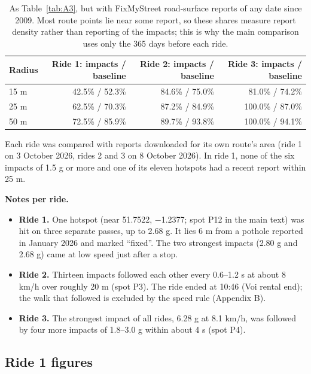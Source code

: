 \begin{table}[htbp]
\centering\small
\caption{As Table~\ref{tab:A3}, but with FixMyStreet road-surface reports of any date since 2009. Most route points lie near some report, so these shares measure report density rather than reporting of the impacts; this is why the main comparison uses only the 365 days before each ride.}\label{tab:A3any}
\begin{tabular}{@{}lrrr@{}}
\toprule
Radius & Ride 1: impacts / baseline & Ride 2: impacts / baseline & Ride 3: impacts / baseline \\
\midrule
15 m & 42.5\% / 52.3\% & 84.6\% / 75.0\% & 81.0\% / 74.2\% \\
25 m & 62.5\% / 70.3\% & 87.2\% / 84.9\% & 100.0\% / 87.0\% \\
50 m & 72.5\% / 85.9\% & 89.7\% / 93.8\% & 100.0\% / 94.1\% \\
\bottomrule
\end{tabular}
\end{table}

Each ride was compared with reports downloaded for its own route's area (ride 1 on
3 October 2026, rides 2 and 3 on 8 October 2026). In ride 1, none of the six impacts of
1.5 g or more and one of its eleven hotspots had a recent report within 25 m.

\textbf{Notes per ride.}

\begin{itemize}
\tightlist
\item
  \textbf{Ride 1.} One hotspot (near 51.7522, −1.2377; spot P12 in the main text) was hit on
  three separate passes, up to 2.68 g. It lies 6 m from a pothole reported in January
  2026 and marked ``fixed''. The two strongest impacts (2.80 g and 2.68 g) came at low
  speed just after a stop.
\item
  \textbf{Ride 2.} Thirteen impacts followed each other every 0.6--1.2 s at about 8 km/h over
  roughly 20 m (spot P3). The ride ended at 10:46 (Voi rental end); the walk that
  followed is excluded by the speed rule (Appendix B).
\item
  \textbf{Ride 3.} The strongest impact of all rides, 6.28 g at 8.1 km/h, was followed by four
  more impacts of 1.8--3.0 g within about 4 s (spot P4).
\end{itemize}

\FloatBarrier
\subsection{Ride 1 figures}

